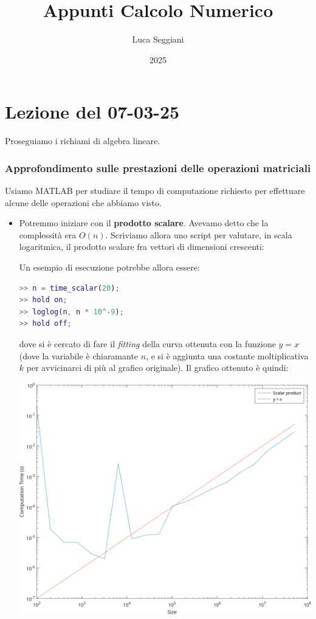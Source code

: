 \documentclass[a4paper,11pt]{article}
\title{Appunti Calcolo Numerico}
\author{Luca Seggiani}
\date{2025}
\begin{document}
\section{Lezione del 07-03-25}

\thispagestyle{empty}
\pagestyle{fancy}

Proseguiamo i richiami di algebra lineare.

\subsubsection{Approfondimento sulle prestazioni delle operazioni matriciali}
Usiamo MATLAB per studiare il tempo di computazione richiesto per effettuare alcune delle operazioni che abbiamo visto.

\begin{itemize}
	\item Potremmo iniziare con il \textbf{prodotto scalare}. Avevamo detto che la complessità era $O(n)$. Scriviamo allora uno script per valutare, in scala logaritmica, il prodotto scalare fra vettori di dimensioni crescenti:
\lstset{style=codestyle, language=MATLAB}


Un esempio di esecuzione potrebbe allora essere:
\begin{lstlisting}[language=MATLAB, style=codestyle]	
>> n = time_scalar(20);
>> hold on;
>> loglog(n, n * 10^-9);
>> hold off;
\end{lstlisting}
dove si è cercato di fare il \textit{fitting} della curva ottenuta con la funzione $y = x$ (dove la variabile è chiaramante $n$, e si è aggiunta una costante moltiplicativa $k$ per avvicinarci di più al grafico originale).
Il grafico ottenuto è quindi:

\begin{center}
	\includegraphics[scale=0.6]{../figures/scalar_perf.png}
\end{center}


\end{itemize}
\end{document}
